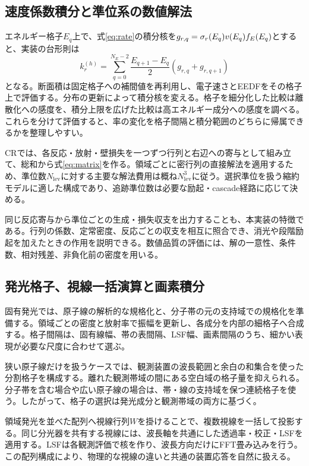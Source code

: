 \subsection{速度係数積分と準位系の数値解法}
エネルギー格子$E_q$上で、式\eqref{eq:rate}の積分核を$g_{r,q}=\sigma_r(E_q)v(E_q)f_E(E_q)$とすると、実装の台形則は
\begin{equation}
k_r^{(h)}=\sum_{q=0}^{N_E-2}\frac{E_{q+1}-E_q}{2}
\left(g_{r,q}+g_{r,q+1}\right)
\label{eq:discrete-rate}
\end{equation}
となる。断面積は固定格子への補間値を再利用し、電子速さとEEDFをその格子上で評価する。分布の更新によって積分核を変える。格子を細分化した比較は離散化への感度を、積分上限を広げた比較は高エネルギー成分への感度を調べる。これらを分けて評価すると、率の変化を格子間隔と積分範囲のどちらに帰属できるかを整理しやすい。

CRでは、各反応・放射・壁損失を一つずつ行列と右辺への寄与として組み立て、総和から式\eqref{eq:matrix}を作る。領域ごとに密行列の直接解法を適用するため、準位数$N_{\mathrm{lev}}$に対する主要な解法費用は概ね$N_{\mathrm{lev}}^3$に従う。選択準位を扱う縮約モデルに適した構成であり、追跡準位数は必要な励起・cascade経路に応じて決める。

同じ反応寄与から準位ごとの生成・損失収支を出力することも、本実装の特徴である。行列の係数、定常密度、反応ごとの収支を相互に照合でき、消光や段階励起を加えたときの作用を説明できる。数値品質の評価には、解の一意性、条件数、相対残差、非負化前の密度を用いる。

\subsection{発光格子、視線一括演算と画素積分}
固有発光では、原子線の解析的な規格化と、分子帯の元の支持域での規格化を準備する。領域ごとの密度と放射率で振幅を更新し、各成分を内部の細格子へ合成する。格子間隔は、固有線幅、帯の表間隔、LSF幅、画素間隔のうち、細かい表現が必要な尺度に合わせて選ぶ。

狭い原子線だけを扱うケースでは、観測装置の波長範囲と余白の和集合を使った分割格子を構成する。離れた観測帯域の間にある空白域の格子量を抑えられる。分子帯を含む場合や広い原子線の場合は、帯・線の支持域を保つ連続格子を使う。したがって、格子の選択は発光成分と観測帯域の両方に基づく。

領域発光を並べた配列へ視線行列$W$を掛けることで、複数視線を一括して投影する。同じ分光器を共有する視線には、波長軸を共通にした透過率・校正・LSFを適用する。LSFは各観測評価で核を作り、波長方向だけにFFT畳み込みを行う。この配列構成により、物理的な視線の違いと共通の装置応答を自然に扱える。


